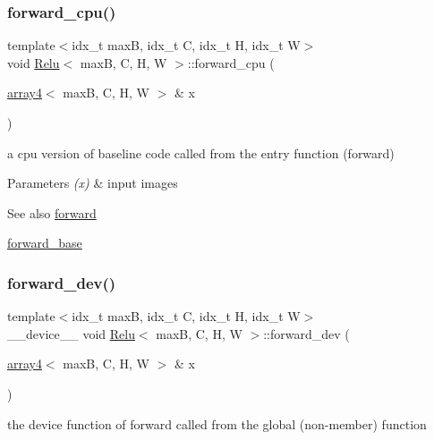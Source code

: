 \subsubsection{\texorpdfstring{forward\+\_\+cpu()}{forward\_cpu()}}
{\footnotesize\ttfamily template$<$idx\+\_\+t maxB, idx\+\_\+t C, idx\+\_\+t H, idx\+\_\+t W$>$ \\
void \hyperlink{structRelu}{Relu}$<$ maxB, C, H, W $>$\+::forward\+\_\+cpu (\begin{DoxyParamCaption}\item[{\hyperlink{structarray4}{array4}$<$ maxB, C, H, W $>$ \&}]{x }\end{DoxyParamCaption})\hspace{0.3cm}{\ttfamily [inline]}}



a cpu version of baseline code called from the entry function (forward) 


\begin{DoxyParams}{Parameters}
{\em (x)} & input images \\
\hline
\end{DoxyParams}
\begin{DoxySeeAlso}{See also}
\hyperlink{structRelu_a71f8322b10508a210025151ad788226f}{forward} 

\hyperlink{structRelu_a41981da3c54691ae68933d5802a6518b}{forward\+\_\+base} 
\end{DoxySeeAlso}
\mbox{\label{structRelu_aba6323a49a9e24b29bbb18b27707bae8}} 
\subsubsection{\texorpdfstring{forward\+\_\+dev()}{forward\_dev()}}
{\footnotesize\ttfamily template$<$idx\+\_\+t maxB, idx\+\_\+t C, idx\+\_\+t H, idx\+\_\+t W$>$ \\
\+\_\+\+\_\+device\+\_\+\+\_\+ void \hyperlink{structRelu}{Relu}$<$ maxB, C, H, W $>$\+::forward\+\_\+dev (\begin{DoxyParamCaption}\item[{\hyperlink{structarray4}{array4}$<$ maxB, C, H, W $>$ \&}]{x }\end{DoxyParamCaption})\hspace{0.3cm}{\ttfamily [inline]}}



the device function of forward called from the global (non-\/member) function 


